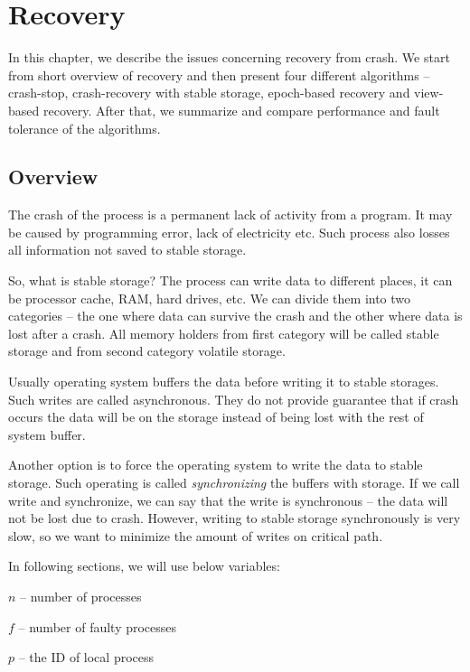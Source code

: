 \chapter{Recovery}
\label{chapter:recovery}

In this chapter, we describe the issues concerning recovery from crash. We start from short overview of recovery and then present four different algorithms -- crash-stop, crash-recovery with stable storage, epoch-based recovery and view-based recovery. \linebreak After that, we summarize and compare performance and fault tolerance of the algorithms.

\section{Overview}

The crash of the process is a permanent lack of activity from a program. It may be caused by programming error, lack of electricity etc. Such process also losses all information not saved to stable storage.

So, what is stable storage? The process can write data to different places, it can be processor cache, RAM, hard drives, etc. We can divide them into two categories -- the one where data can survive the crash and the other where data is lost after a crash. All memory holders from first category will be called stable storage and from second category volatile storage.

Usually operating system buffers the data before writing it to stable storages. Such writes are called asynchronous. They do not provide guarantee that if crash occurs the data will be on the storage instead of being lost with the rest of system buffer.

Another option is to force the operating system to write the data to stable storage. Such operating is called \emph{synchronizing} the buffers with storage. If we call write and synchronize, we can say that the write is synchronous -- the data will not be lost due to crash. However, writing to stable storage synchronously is very slow, so we want to minimize the amount of writes on critical path.

In following sections, we will use below variables: 
\begin{tightList}
  \item[$n$] -- number of processes
  \item[$f$] -- number of faulty processes
  \item[$p$] -- the ID of local process
\end{tightList}

